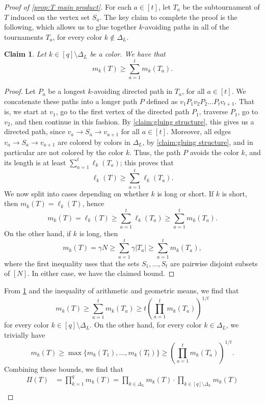 \documentclass[11pt,reqno]{amsart}
\newtheorem{claim}[theorem]{Claim}
\theoremstyle{definition}
\newcommand\ab[1]{\lvert#1\rvert}
\newcommand\1{\mathbf{1}}
\let\geq\geqslant
\begin{document}
\begin{proof}[Proof of \cref{prop:T main product}]
    For each $a \in [t]$, let $T_a$ be the subtournament of $T$ induced on the vertex set $S_a$. The key claim to complete the proof is the following, which allows us to glue together $k$-avoiding paths in all of the tournaments $T_a$, for every color $k \notin \Delta_L$. 
    \begin{claim}\label{claim:T glue paths}
        Let $k\in [q] \setminus \Delta_L$ be a color. We have that
        \[
            m_k(T) \geq \sum_{a=1}^t m_k(T_a).
        \]
    \end{claim}
    \begin{proof}
        Let $P_a$ be a longest $k$-avoiding directed path in $T_a$, for all $a \in [t]$. We concatenate these paths into a longer path $P$ defined as $v_1P_1v_2P_2 \dots P_t v_{t+1}$. That is, we start at $v_1$, go to the first vertex of the directed path $P_1$, traverse $P_1$, go to $v_2$, and then continue in this fashion. By \cref{claim:gluing structure}, this gives us a directed path, since $v_a \to S_a \to v_{a+1}$ for all $a \in [t]$. Moreover, all edges $v_a \to S_a \to v_{a+1}$ are colored by colors in $\Delta_L$, by \cref{claim:gluing structure}, and in particular are not colored by the color $k$. Thus, the path $P$ avoids the color $k$, and its length is at least $\sum_{a=1}^t \ell_k(T_a)$; this proves that
        \[
            \ell_k(T) \geq \sum_{a=1}^t \ell_k(T_a).
        \]
        We now split into cases depending on whether $k$ is long or short. If $k$ is short, then $m_k(T)=\ell_k(T)$, hence
        \[
            m_k(T)=\ell_k(T) \geq \sum_{a=1}^t \ell_k(T_a) \geq \sum_{a=1}^t m_k(T_a).
        \]
        On the other hand, if $k$ is long, then
        \[
            m_k(T) = \gamma N \geq \sum_{a=1}^t \gamma \ab{T_a} \geq \sum_{a=1}^t m_k(T_a),
        \]
        where the first inequality uses that the sets $S_1,\dots,S_t$ are pairwise disjoint subsets of $[N]$. 
        In either case, we have the claimed bound.
    \end{proof}
    From \cref{claim:T glue paths} and the inequality of arithmetic and geometric means, we find that
    \[
        m_k(T) \geq \sum_{a=1}^t m_k(T_a) \geq t \left( \prod_{a=1}^t m_k(T_a) \right)^{1/t}
    \]
    for every color $k \in [q] \setminus \Delta_L$. On the other hand, for every color $k \in \Delta_L$, we trivially have
    \[
        m_k(T) \geq \max\{m_k(T_1),\dots,m_k(T_t)\} \geq \left( \prod_{a=1}^t m_k(T_a) \right)^{1/t}.
    \]
    Combining these bounds, we find that
    \begin{align*}
        \Pi(T) &= \prod_{k=1}^q m_k(T) =\prod_{k\in \Delta_L} m_k(T) \cdot \prod_{k\in [q] \setminus \Delta_L} m_k(T)\\

\end{align*}
\end{proof}
\end{document}

